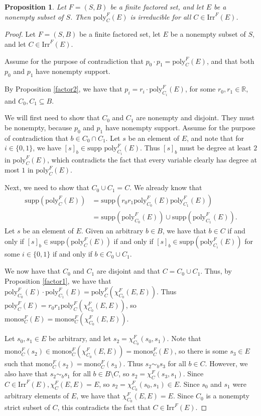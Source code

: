\documentclass[authordate,onecolumn]{miri-tech-article}
\newtheorem{proposition}{Proposition}
\begin{document}
\begin{proposition}
Let $F=(S,B)$ be a finite factored set, and let $E$ be a nonempty subset of $S$. Then $\text{poly}^F_C(E)$ is irreducible for all $C\in \text{Irr}^F(E)$.
\end{proposition}
\begin{proof}
Let $F=(S,B)$ be a finite factored set, let $E$ be a nonempty subset of $S$, and let $C\in \text{Irr}^F(E)$.

Assume for the purpose of contradiction that $p_0\cdot p_1=\text{poly}^F_C(E)$, and that both $p_0$ and $p_1$ have nonempty support.

By Proposition \ref{factor2}, we have that $p_i=r_i\cdot \text{poly}^F_{C_i}(E)$, for some $r_0,r_1\in\mathbb R$, and $C_0,C_1\subseteq B$. 

We will first need to show that $C_0$ and $C_1$ are nonempty and disjoint. They must be nonempty, because $p_0$ and $p_1$ have nonempty support. Assume for the purpose of contradiction that $b\in C_0\cap C_1$. Let $s$ be an element of $E$, and note that for $i\in\{0,1\}$, we have $[s]_b\in \text{supp }\text{poly}^F_{C_i}(E)$. Thus $[s]_b$ must be degree at least $2$ in $\text{poly}^F_C(E)$, which contradicts the fact that every variable clearly has degree at most $1$ in $\text{poly}^F_C(E)$. 

Next, we need to show that $C_0\cup C_1=C$. We already know that
\begin{equation} \begin{split} \text{supp}(\text{poly}^F_C(E)) & =\text{supp}(r_0r_1\text{poly}^F_{C_0}(E)\text{poly}^F_{C_1}(E)) \\ & = \text{supp}(\text{poly}^F_{C_0}(E))\cup \text{supp}(\text{poly}^F_{C_1}(E)). \end{split} \end{equation}
Let $s$ be an element of $E$. Given an arbitrary $b\in B$, we have that $b\in C$ if and only if $[s]_b\in \text{supp}(\text{poly}^F_C(E))$ if and only if $[s]_b \in\text{supp}(\text{poly}^F_{C_i}(E))$ for some $i\in \{0,1\}$ if and only if $b\in C_0\cup C_1$. 

We now have that $C_0$ and $C_1$ are disjoint and that $C=C_0\cup C_1$. Thus, by Proposition \ref{factor1}, we have that $\text{poly}^F_{C_0}(E)\cdot \text{poly}^F_{C_1}(E)=\text{poly}^F_{C}(\chi^F_{C_0}(E,E))$. Thus $\text{poly}^F_{C}(E)=r_0r_1\text{poly}^F_{C}(\chi^F_{C_0}(E,E))$, so $\text{monos}^F_{C}(E)=\text{monos}^F_{C}(\chi^F_{C_0}(E,E))$.

Let $s_0,s_1\in E$ be arbitrary, and let $s_2=\chi_{C_0}^F(s_0,s_1)$. Note that $\text{mono}_C^F(s_2)\in \text{monos}^F_{C}(\chi^F_{C_0}(E,E))=\text{monos}^F_{C}(E)$, so there is some $s_3\in E$ such that $\text{mono}_C^F(s_2)=\text{mono}_C^F(s_3)$. Thus $s_2\sim_b s_3$ for all $b\in C$. However, we also have that $s_2\sim_b s_1$ for all $b\in B\setminus C$, so $s_2=\chi_C^F(s_3,s_1)$. Since $C\in \text{Irr}^F(E), \chi_C^F(E,E)=E$, so $s_2=\chi_{C_0}^F(s_0,s_1)\in E$. Since $s_0$ and $s_1$ were arbitrary elements of $E$, we have that $\chi^F_{C_0}(E,E)=E$. Since $C_0$ is a nonempty strict subset of $C$, this contradicts the fact that $C\in \text{Irr}^F(E)$.


\end{proof}
\end{document}
